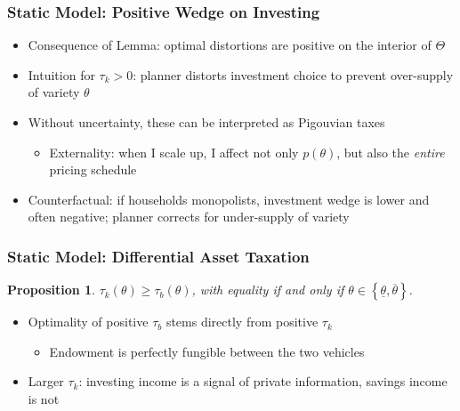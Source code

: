 \documentclass{beamer}
\newtheorem{proposition}{Proposition}
\begin{document}
\begin{frame}
    \frametitle{Static Model: Positive Wedge on Investing}

    \begin{itemize}
        \item Consequence of Lemma: optimal distortions are positive on the interior of \( \Theta \)
        \item Intuition for \( \tau_k>0 \): planner distorts investment choice to prevent over-supply of variety \( \theta \) 
        \item Without uncertainty, these can be interpreted as Pigouvian taxes 
        \begin{itemize}
            \item Externality: when I scale up, I affect not only \( p(\theta) \), but also the \textit{entire} pricing schedule 
        \end{itemize}
        \item Counterfactual: if households monopolists, investment wedge is lower and often negative; planner corrects for under-supply of variety 
    \end{itemize}

\end{frame}

\begin{frame}
    \frametitle{Static Model: Differential Asset Taxation}

    \begin{proposition} \label{prop:tauk_bigger}
        \( \tau_{k}\left(\theta\right)\ge\tau_{b}\left(\theta\right) \), with equality if and only if \( \theta\in\left\{ \underline{\theta},\overline{\theta}\right\}  \).
    \end{proposition}
    \begin{itemize}
        \item Optimality of positive \( \tau_b \) stems directly from positive \( \tau_k \) 
        \begin{itemize}
            \item Endowment is perfectly fungible between the two vehicles
        \end{itemize}
        \item Larger \( \tau_k \): investing income is a signal of private information, savings income is not
    \end{itemize}
\end{frame}
\end{document}
